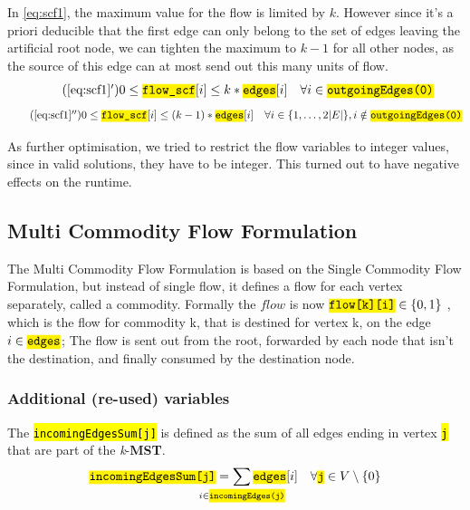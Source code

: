 \documentclass[,%
			paper=a4,%
			DIV14,
			liststotoc,
			bibtotoc,
			draft=false,%
			numbers=noendperiod
			]{scrartcl}
\newcommand{\mst}{\textbf{MST}}
\newcommand{\kmst}{\textit{k}-\mst}
\newcommand{\ilc}[1]{\hl{\texttt{#1}}} %
\newcommand{\commodity}{j}
\newcommand{\edge}{i}
\newcommand{\forallEdges}{\ensuremath{\forall \edge \in \{1, \dotsc, 2|E|\}}}
\begin{document}
In \eqref{eq:scf1}, the maximum value for the flow is limited by $k$. However since it's a priori deducible that the first edge can only belong to the set of edges leaving the artificial root node, we can tighten the maximum to $k-1$ for all other nodes, as the source of this edge can at most send out this many units of flow.
\begin{equation}\tag{\ref{eq:scf1}$^\prime$}
	0 \leq \ilc{flow\_scf}[i] \leq k * \ilc{edges}[i] \quad \forall i \in \ilc{outgoingEdges(0)} 
\end{equation}
\begin{equation}\tag{\ref{eq:scf1}$^{\prime\prime}$}
	0 \leq \ilc{flow\_scf}[i] \leq (k-1) * \ilc{edges}[i] \quad \forallEdges, i \notin \ilc{outgoingEdges(0)}
\end{equation}

As further optimisation, we tried to restrict the flow variables to integer values, since in valid solutions, they have to be integer. This turned out to have negative effects on the runtime.

\subsection{Multi Commodity Flow Formulation}
The Multi Commodity Flow Formulation is based on the Single Commodity Flow Formulation, but instead of single flow, it defines a flow for each vertex separately, called a commodity. Formally the $flow$ is now $\ilc{flow[k][i]} \in \left\{0,1\right\}$ , which is the flow for commodity k, that is destined for vertex k, on the edge $i \in \ilc{edges}$; The flow is sent out from the root, forwarded by each node that isn't the destination, and finally consumed by the destination node.

\subsubsection{Additional (re-used) variables}
The \ilc{incomingEdgesSum[\commodity]} is defined as the sum of all edges ending in vertex \ilc{\commodity} that are part of the \kmst.
\begin{equation}\label{eq:mfcInEdges}
	\ilc{incomingEdgesSum[\commodity]} = \sum_{\mathclap{i \in \ilc{incomingEdges(\commodity)}}} \ilc{edges}[i]
\quad \forall \ilc{\commodity} \in V \setminus \{0\}
\end{equation}
\end{document}
